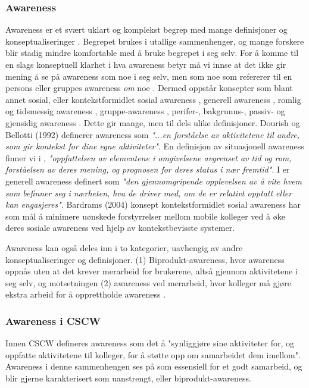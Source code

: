 \subsubsection{Awareness}
Awareness er et svært uklart og komplekst begrep med mange definisjoner og konseptualiseringer \cite{KlemetsRedundancy, Gutwin04, Schmidt02}. Begrepet brukes i utallige sammenhenger, og mange forskere blir stadig mindre komfortable med å bruke begrepet i seg selv. For å komme til en slags konseptuell klarhet i hva awareness betyr må vi innse at det ikke gir mening å se på awareness som noe i seg selv, men som noe som refererer til en persons eller gruppes awareness \emph{om} noe \cite{Schmidt02}. Dermed oppstår konsepter som blant annet sosial, eller kontekstformidlet sosial awareness \cite{Bardram04}, generell awareness \cite{Gross13}, romlig og tidsmessig awareness \cite{Randell}, gruppe-awareness \cite{Gutwin04}, perifer-, bakgrunns-, passiv- og gjensidig awareness \cite{Schmidt02}. Dette gir mange, men til dels ulike definisjoner. Dourish og Bellotti (1992) definerer awareness som \emph{"...en forståelse av aktivitetene til andre, som gir kontekst for dine egne aktiviteter"}. En  definisjon av situasjonell awareness finner vi i \cite{Endsly95}, \emph{"oppfattelsen av elementene i omgivelsene avgrenset av tid og rom, forståelsen av deres mening, og prognosen for deres status i nær fremtid"}. I \cite{Gross13} er generell awareness definert som \emph{"den gjennomgripende opplevelsen av å vite hvem som befinner seg i nærheten, hva de driver med, om de er relativt opptatt eller kan engasjeres"}. Bardrams (2004) konsept kontekstformidlet sosial awareness har som mål å minimere uønskede forstyrrelser mellom mobile kolleger ved å øke deres sosiale awareness ved hjelp av kontekstbevisste systemer. 

\noindent
Awareness kan også deles inn i to kategorier, uavhengig av andre konseptualiseringer og definisjoner. (1) Biprodukt-awareness, hvor awareness oppnås uten at det krever merarbeid for brukerene, altså gjennom aktivitetene i seg selv, og motsetningen (2) awareness ved merarbeid, hvor kolleger må gjøre ekstra arbeid for å opprettholde awareness \cite{Randell}. 


\subsubsection{Awareness i CSCW}
Innen CSCW defineres awareness som det å "synliggjøre sine aktiviteter for, og oppfatte aktivitetene til kolleger, for å støtte opp om samarbeidet dem imellom". Awareness i denne sammenhengen ses på som essensiell for et godt samarbeid, og blir gjerne karakterisert som uanstrengt, eller biprodukt-awareness\cite{Randell}. 

